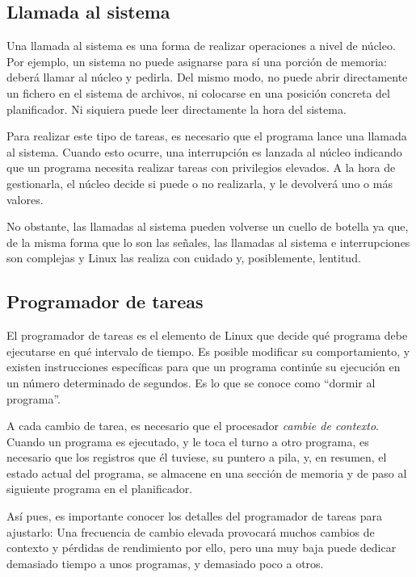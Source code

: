 \subsection{Llamada al sistema}
Una llamada al sistema es una forma de realizar operaciones a nivel de núcleo. Por ejemplo, un sistema no puede 
asignarse para sí una porción de memoria: deberá llamar al núcleo y pedirla. Del mismo modo, no puede abrir 
directamente un fichero en el sistema de archivos, ni colocarse en una posición concreta del planificador. Ni siquiera 
puede leer directamente la hora del sistema.

Para realizar este tipo de tareas, es necesario que el programa lance una llamada al sistema. Cuando esto ocurre, una 
interrupción es lanzada al núcleo indicando que un programa necesita realizar tareas con privilegios elevados. A la 
hora de gestionarla, el núcleo decide si puede o no realizarla, y le devolverá uno o más valores.

No obstante, las llamadas al sistema pueden volverse un cuello de botella ya que, de la misma forma que lo son las 
señales, las llamadas al sistema e interrupciones son complejas y Linux las realiza con cuidado y, posiblemente, 
lentitud.

\subsection{Programador de tareas}
El programador de tareas es el elemento de Linux que decide qué programa debe ejecutarse en qué intervalo de tiempo. Es 
posible modificar su comportamiento, y existen instrucciones específicas para que un programa continúe su ejecución en 
un número determinado de segundos. Es lo que se conoce como ``dormir al programa''.

A cada cambio de tarea, es necesario que el procesador \emph{cambie de contexto}. Cuando un 
programa es ejecutado, y le toca el turno a otro programa, es necesario que los registros que él tuviese, su puntero a 
pila, y, en resumen, el estado actual del programa, se almacene en una sección de memoria y de paso al siguiente 
programa en el planificador.

Así pues, es importante conocer los detalles del programador de tareas para ajustarlo: Una frecuencia de cambio elevada 
provocará muchos cambios de contexto y pérdidas de rendimiento por ello, pero una muy baja puede dedicar demasiado 
tiempo a unos programas, y demasiado poco a otros.

